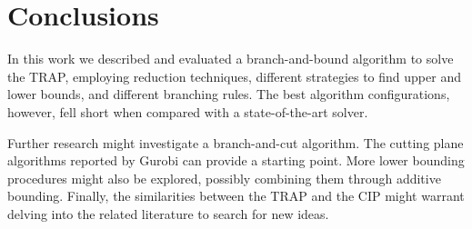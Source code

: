 \documentclass[runningheads]{llncs}
\begin{document}
\section{Conclusions}
\label{sec:conclusions}

In this work we described and evaluated a branch-and-bound algorithm to solve the TRAP, employing reduction techniques, different strategies to find upper and lower bounds, and different branching rules. The best algorithm configurations, however, fell short when compared with a state-of-the-art solver.

Further research might investigate a branch-and-cut algorithm. The cutting plane algorithms reported by Gurobi can provide a starting point. More lower bounding procedures might also be explored, possibly combining them through additive bounding. Finally, the similarities between the TRAP and the CIP might warrant delving into the related literature to search for new ideas. 



\end{document}
